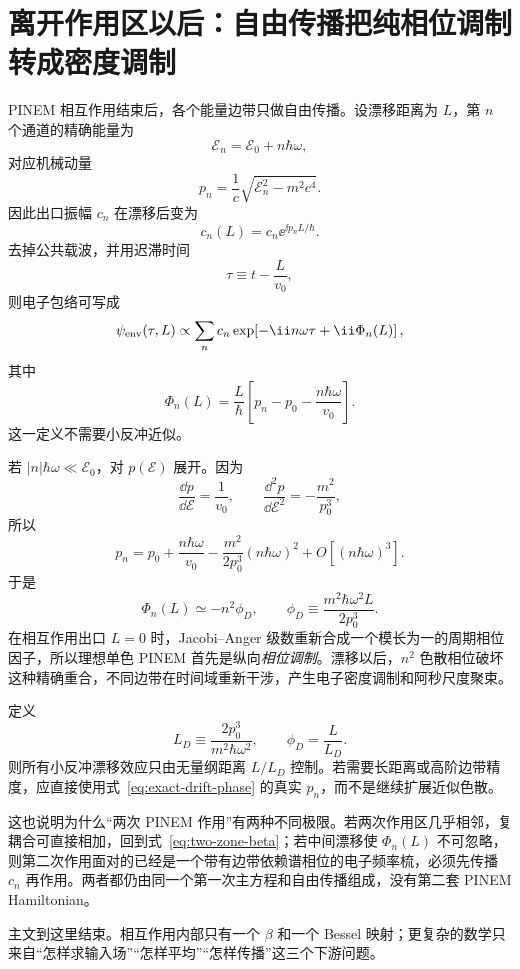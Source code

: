\section{离开作用区以后：自由传播把纯相位调制转成密度调制}

PINEM 相互作用结束后，各个能量边带只做自由传播。设漂移距离为 \(L\)，第 \(n\) 个通道的精确能量为
\begin{equation}
\mathcal E_n=\mathcal E_0+n\hbar\omega,
\end{equation}
对应机械动量
\begin{equation}
p_n=\frac{1}{c}\sqrt{\mathcal E_n^2-m^2c^4}.
\end{equation}
因此出口振幅 \(c_n\) 在漂移后变为
\begin{equation}
c_n(L)=c_n\ee^{\ii p_nL/\hbar}.
\end{equation}
去掉公共载波，并用迟滞时间
\begin{equation}
\tau\equiv t-\frac{L}{v_0},
\end{equation}
则电子包络可写成
\begin{equation}
\psi_{\rm env}(\tau,L)
\propto
\sum_n c_n
\exp\!\left[-\ii n\omega\tau+\ii\Phi_n(L)\right],
\end{equation}
其中
\begin{equation}
\Phi_n(L)
=\frac{L}{\hbar}\left[
p_n-p_0-\frac{n\hbar\omega}{v_0}
\right].
\label{eq:exact-drift-phase}
\end{equation}
这一定义不需要小反冲近似。

若 \(|n|\hbar\omega\ll\mathcal E_0\)，对 \(p(\mathcal E)\) 展开。因为
\begin{equation}
\frac{\dd p}{\dd\mathcal E}=\frac{1}{v_0},
\qquad
\frac{\dd^2p}{\dd\mathcal E^2}=-\frac{m^2}{p_0^3},
\end{equation}
所以
\begin{equation}
p_n
=p_0+\frac{n\hbar\omega}{v_0}
-\frac{m^2}{2p_0^3}(n\hbar\omega)^2
+O[(n\hbar\omega)^3].
\end{equation}
于是
\begin{equation}
\boxed{
\Phi_n(L)
\simeq-n^2\phi_D,
\qquad
\phi_D\equiv
\frac{m^2\hbar\omega^2L}{2p_0^3}.}
\label{eq:quadratic-drift-phase}
\end{equation}
在相互作用出口 \(L=0\) 时，Jacobi--Anger 级数重新合成一个模长为一的周期相位因子，所以理想单色 PINEM 首先是纵向\emph{相位调制}。漂移以后，\(n^2\) 色散相位破坏这种精确重合，不同边带在时间域重新干涉，产生电子密度调制和阿秒尺度聚束。

定义
\begin{equation}
\boxed{
L_D\equiv\frac{2p_0^3}{m^2\hbar\omega^2},
\qquad
\phi_D=\frac{L}{L_D}.}
\label{eq:dispersion-length}
\end{equation}
则所有小反冲漂移效应只由无量纲距离 \(L/L_D\) 控制。若需要长距离或高阶边带精度，应直接使用式~\eqref{eq:exact-drift-phase} 的真实 \(p_n\)，而不是继续扩展近似色散。

这也说明为什么“两次 PINEM 作用”有两种不同极限。若两次作用区几乎相邻，复耦合可直接相加，回到式~\eqref{eq:two-zone-beta}；若中间漂移使 \(\Phi_n(L)\) 不可忽略，则第二次作用面对的已经是一个带有边带依赖谱相位的电子频率梳，必须先传播 \(c_n\) 再作用。两者都仍由同一个第一次主方程和自由传播组成，没有第二套 PINEM Hamiltonian。

主文到这里结束。相互作用内部只有一个 \(\beta\) 和一个 Bessel 映射；更复杂的数学只来自“怎样求输入场”“怎样平均”“怎样传播”这三个下游问题。
